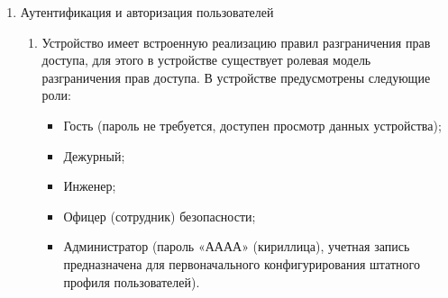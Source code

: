 \begin{enumerate}[label=\arabic{section}.\arabic{subsection}.\arabic*, labelsep=4pt, leftmargin=0pt, itemindent=57pt]
\begin{enumerate}[label=\arabic{section}.\arabic{subsection}.\arabic{enumi}.\arabic*, labelsep=4pt, leftmargin=0em, itemindent=65pt, parsep=0pt]
\item
Система самодиагностики фиксирует критические неисправности («Неисправность») и некритические ошибки («Ошибка»). По факту выхода из режимов критической неисправности и предупредительной сигнализации производится запись в журнале событий. Подробное описание системы самодиагностики приводится в документации ЮТКБ.656122.609 РЭ «Устройство защиты и автоматики серии «ЮНИТ-М300». Руководство по эксплуатации общее».

\item
В случае появления критической неисправности активируется внутренний сигнал «Критическая неисправность», производится запись в журнал событий, замыкаются контакты реле IRF, прекращается работа алгоритмов основных функций в составе устройства, это состояние устройства сигнализируется свечением светодиода «Неисправность» и отсутствием свечения светодиода «Готовность». Для выхода из режима критической неисправности требуется перезапуск устройства.

\item
В случае появления некритической ошибки активируется внутренний сигнал «Некритическая ошибка», производится запись в журнал событий, алгоритмы основных функций в составе устройства продолжают выполняться, это состояние устройства сигнализируется свечением светодиода «Неисправность» и отсутствием свечения светодиода «Готовность». Устройство может выйти из режима предупредительной сигнализации без активных действий со стороны пользователя по факту пропадания критериев режима.

\end{enumerate}

\item Аутентификация и авторизация пользователей
\begin{enumerate}[label=\arabic{section}.\arabic{subsection}.\arabic{enumi}.\arabic*, labelsep=4pt, leftmargin=0em, itemindent=65pt, parsep=0pt]

\item Устройство имеет встроенную реализацию правил разграничения прав доступа, для этого в устройстве существует ролевая модель разграничения прав доступа.
В устройстве предусмотрены следующие роли:
\begin{itemize}
\item Гость (пароль не требуется, доступен просмотр данных устройства);
\item Дежурный;
\item Инженер;
\item Офицер (сотрудник) безопасности;
\item Администратор (пароль «АААА» (кириллица), учетная запись предназначена для первоначального конфигурирования штатного профиля пользователей).
\end{itemize}


\end{enumerate}
\end{enumerate}
